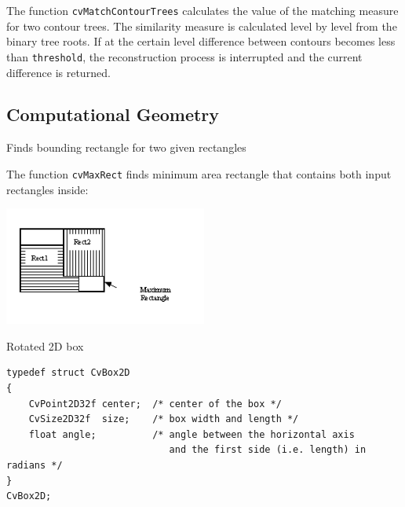 \begin{description}
\end{description}

The function \texttt{cvMatchContourTrees} calculates the value of the matching measure for two contour trees. The similarity measure is calculated level by level from the binary tree roots. If at the certain level difference between contours becomes less than \texttt{threshold}, the reconstruction process is interrupted and the current difference is returned.

\subsection{Computational Geometry}

\label{MaxRect}

Finds bounding rectangle for two given rectangles


\begin{description}
\end{description}

The function \texttt{cvMaxRect} finds minimum area rectangle that contains both input rectangles inside:

\includegraphics[width=0.5\textwidth]{pics/maxrect.png}

\label{CvBox2D}

Rotated 2D box

\begin{lstlisting}
typedef struct CvBox2D
{
    CvPoint2D32f center;  /* center of the box */
    CvSize2D32f  size;    /* box width and length */
    float angle;          /* angle between the horizontal axis
                             and the first side (i.e. length) in radians */
}
CvBox2D;
\end{lstlisting}

